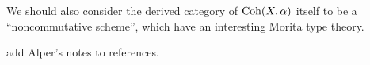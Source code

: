 \documentclass[12pt]{article}
\newcommand{\et}{\text{\'{e}t}}
\newcommand{\PGL}{\mathrm{PGL}}
\begin{document}
We should also consider the derived category of $\operatorname{Coh}(X,\alpha)$ itself to be a ``noncommutative scheme'', which have an interesting Morita type theory.










{\color{red} add Alper's notes to references.}

\printbibliography
\end{document}
